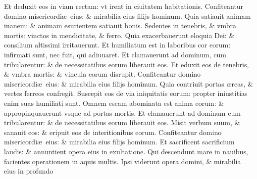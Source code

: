 \documentclass[a5paper,10pt]{book}
\def\ae{æ}
\begin{document}
\begin{multicols*}{2}
\newline \color{red} E\color{black}t deduxit eos in viam rectam: vt irent in ciuitatem habitationis.
\newline \color{red} C\color{black}onfiteantur domino misericordi\ae \ eius: \& mirabilia eius filijs hominum.
\newline \color{red} Q\color{black}uia satiauit animam inanem: \& animam esurientem satiauit bonis.
\newline \color{red} S\color{black}edentes in tenebris, \& vmbra mortis: vinctos in mendicitate, \& ferro.
\newline \color{red} Q\color{black}uia exacerbauerunt eloquia Dei: \& consilium altissimi irritauerunt.
\newline \color{red} E\color{black}t humiliatum est in laboribus cor eorum: infirmati sunt, nec fuit, qui adiuuaret.
\newline \color{red} E\color{black}t clamauerunt ad dominum, cum tribularentur: \& de necessitatibus eorum liberauit eos.
\newline \color{red} E\color{black}t eduxit eos de tenebris, \& vmbra mortis: \& vincula eorum disrupit.
\newline \color{red} C\color{black}onfiteantur domino misericordi\ae \ eius: \& mirabilia eius filijs hominum.
\newline \color{red} Q\color{black}uia contriuit portas \ae reas, \& vectes ferreos confregit.
\newline \color{red} S\color{black}uscepit eos de via iniquitatis eorum: propter iniustitias enim suas humiliati sunt.
\newline \color{red} O\color{black}mnem escam abominata est anima eorum: \& appropinquauerunt vsque ad portas mortis.
\newline \color{red} E\color{black}t clamauerunt ad dominum cum tribularentur: \& de necessitatibus eorum liberauit eos.
\newline \color{red} M\color{black}isit verbum suum, \& sanauit eos: \& eripuit eos de interitionibus eorum.
\newline \color{red} C\color{black}onfiteantur domino misericordi\ae \ eius: \& mirabilia eius filijs hominum.
\newline \color{red} E\color{black}t sacrificent sacrificium laudis: \& annuntient opera eius in exultatione.
\newline \color{red} Q\color{black}ui descendunt mare in nauibus, facientes operationem in aquis multis.
\newline \color{red} I\color{black}psi viderunt opera domini, \& mirabilia eius in profundo

\end{multicols*}
\end{document}

